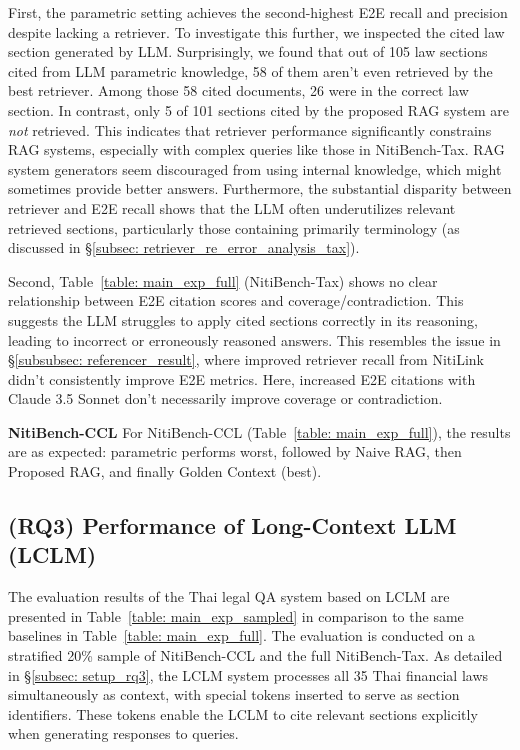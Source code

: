 First, the parametric setting achieves the second-highest E2E recall and precision despite lacking a retriever. 
%
To investigate this further, we inspected the cited law section generated by LLM. 
%
Surprisingly, we found that out of 105 law sections cited from LLM parametric knowledge, 58 of them aren't even retrieved by the best retriever. 
%
Among those 58 cited documents, 26 were in the correct law section. 
%
In contrast, only 5 of 101 sections cited by the proposed RAG system are \emph{not} retrieved. 
%
This indicates that retriever performance significantly constrains RAG systems, especially with complex queries like those in NitiBench-Tax. 
%
RAG system generators seem discouraged from using internal knowledge, which might sometimes provide better answers. 
%
Furthermore, the substantial disparity between retriever and E2E recall shows that the LLM often underutilizes relevant retrieved sections, particularly those containing primarily terminology (as discussed in \S\ref{subsec: retriever_re_error_analysis_tax}).
%
%

Second, Table~\ref{table: main_exp_full} (NitiBench-Tax) shows no clear relationship between E2E citation scores and coverage/contradiction. 
%
This suggests the LLM struggles to apply cited sections correctly in its reasoning, leading to incorrect or erroneously reasoned answers. 
%
This resembles the issue in \S\ref{subsubsec: referencer_result}, where improved retriever recall from NitiLink didn't consistently improve E2E metrics. 
%
Here, increased E2E citations with Claude 3.5 Sonnet don't necessarily improve coverage or contradiction.

\textbf{NitiBench-CCL} For NitiBench-CCL (Table~\ref{table: main_exp_full}), the results are as expected: parametric performs worst, followed by Naive RAG, then Proposed RAG, and finally Golden Context (best).

\subsection{(RQ3) Performance of Long-Context LLM (LCLM)}
\label{subsec: rq3_result}

The evaluation results of the Thai legal QA system based on LCLM are presented in Table~\ref{table: main_exp_sampled} in comparison to the same baselines in Table~\ref{table: main_exp_full}. 
%
The evaluation is conducted on a stratified 20\% sample of NitiBench-CCL and the full NitiBench-Tax. 
%
As detailed in \S\ref{subsec: setup_rq3}, the LCLM system processes all 35 Thai financial laws simultaneously as context, with special tokens inserted to serve as section identifiers. 
%
These tokens enable the LCLM to cite relevant sections explicitly when generating responses to queries.

